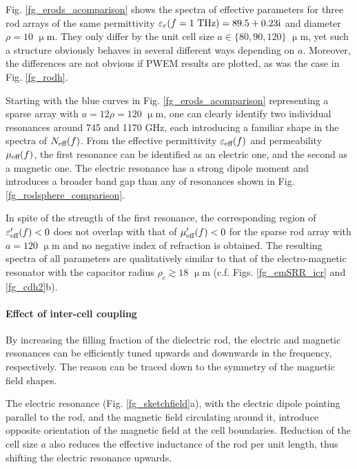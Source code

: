 Fig. \ref{fg_erods_acomparison} shows the spectra of effective parameters for three rod arrays of the same permittivity $\varepsilon_r(f=1\text{ THz}) = 89.5+0.23{\mathrm i}$ and diameter $\rho=10$ $\upmu$m. They only differ by the unit cell size $a \in \{80, 90, 120\}$ $\upmu$m, yet such a structure obviously behaves in several different ways depending on $a$. Moreover, the differences are not obvious if PWEM results are plotted, as was the case in Fig. \ref{fg_rodh}.  

Starting with the blue curves in Fig. \ref{fg_erods_acomparison} representing a sparse array with $a=12\rho = 120$ $\upmu$m, one can clearly identify two individual resonances around 745 and 1170 GHz, each introducing a familiar shape in the spectra of $N_{\text{eff} }(f)$. From the effective permittivity $\varepsilon_{\text{eff} }(f)$ and permeability $\mu_{\text{eff} }(f)$, the first resonance can be identified as an electric one, and the second as a magnetic one. The electric resonance has a strong dipole moment and introduces a broader band gap than any of resonances shown in Fig. \ref{fg_rodsphere_comparison}. %

In spite of the strength of the first resonance, the corresponding region of $\varepsilon_{\text{eff} }'(f)<0$ does not overlap with that of $\mu_{\text{eff} }'(f)<0$ for the sparse rod array with $a=120$ $\upmu$m and no negative index of refraction is obtained. The resulting spectra of all parameters are qualitatively similar to that of the electro-magnetic resonator with the capacitor radius $\rho_c\gtrsim 18$ $\upmu$m  (c.f. Figs. \ref{fg_emSRR_icr} and \ref{fg_cdh2}b).

\paragraph{Effect of inter-cell coupling}%
By increasing the filling fraction of the dielectric rod, the electric and magnetic resonances can be efficiently tuned upwards and downwards in the frequency, respectively. 
The reason can be traced down to the symmetry of the magnetic field shapes. 

The electric resonance (Fig. \ref{fg_sketchfield}a), with the electric dipole pointing parallel to the rod, and the magnetic field circulating around it, introduce opposite orientation of the magnetic field at the cell boundaries. Reduction of the cell size $a$ also reduces the effective inductance of the rod per unit length, thus shifting the electric resonance upwards.

